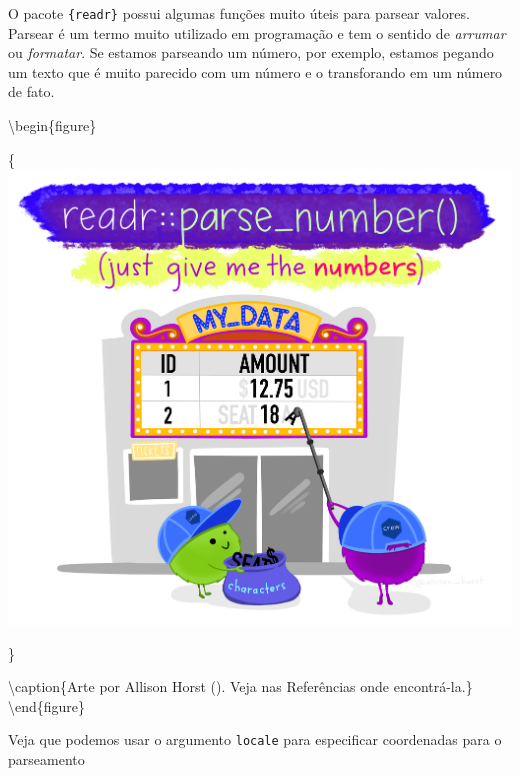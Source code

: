 \documentclass[
]{book}
\newenvironment{Shaded}{\begin{snugshade}}{\end{snugshade}}
\newcommand{\DocumentationTok}[1]{\textcolor[rgb]{0.56,0.35,0.01}{\textbf{\textit{#1}}}}
\newcommand{\FunctionTok}[1]{\textcolor[rgb]{0.00,0.00,0.00}{#1}}
\newcommand{\NormalTok}[1]{#1}
\newcommand{\StringTok}[1]{\textcolor[rgb]{0.31,0.60,0.02}{#1}}
\begin{document}
O pacote \texttt{\{readr\}} possui algumas funções muito úteis para parsear valores. Parsear é um termo muito utilizado em programação e tem o sentido de \emph{arrumar} ou \emph{formatar}. Se estamos parseando um número, por exemplo, estamos pegando um texto que é muito parecido com um número e o transforando em um número de fato.

\begin{Shaded}
\end{Shaded}

\textbackslash begin\{figure\}

\{\centering \includegraphics[width=49.19in]{assets/img/importacao/parse_number}

\}

\textbackslash caption\{Arte por Allison Horst (\citet{allison_horst}). Veja nas Referências onde encontrá-la.\}\label{fig:unnamed-chunk-14}
\textbackslash end\{figure\}

Veja que podemos usar o argumento \texttt{locale} para especificar coordenadas para o parseamento
\end{document}
